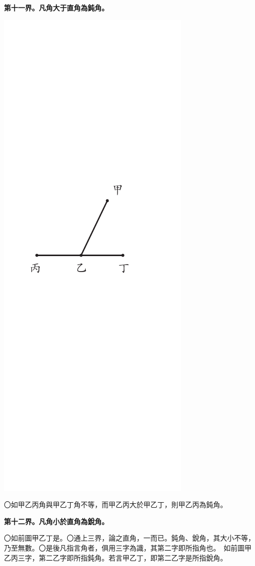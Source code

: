 \documentclass[12pt,b5paper,landscape]{article}
\newcommand{\bcom}[1]{〇#1}
\newcommand{\cthm}[1]{{
\vspace{8pt}

\bfseries #1}}
\begin{document}
\begin{multicols}{2}
\cthm{第十一界。凡角大于直角為鈍角。}
\begin{center}
\includegraphics[angle=90]{eu11}
\end{center}
\bcom{如甲乙丙角與甲乙丁角不等，而甲乙丙大於甲乙丁，則甲乙丙為鈍角。}

\cthm{第十二界。凡角小於直角為銳角。}\bcom{如前圖甲乙丁是。}\bcom{通上三界，論之直角，一而已。鈍角、銳角，其大小不等，乃至無數。}\bcom{是後凡指言角者，俱用三字為識，其第二字即所指角也。　如前圖甲乙丙三字，第二乙字即所指鈍角。若言甲乙丁，即第二乙字是所指銳角。}


\end{multicols}
\end{document}
